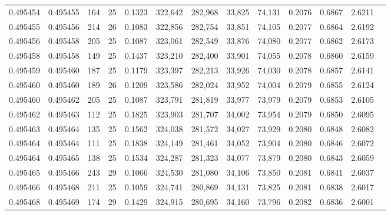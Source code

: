 \begin{tabular}{rrrrrrrrrrrrr}
0.495454 & 0.495455 & 164 &  25 &                                     0.1323 & 322,642 & 282,968 &  33,825 &  74,131 & 0.2076 & 0.6867 & 2.6211 \\
0.495455 & 0.495456 & 214 &  26 &                                     0.1083 & 322,856 & 282,754 &  33,851 &  74,105 & 0.2077 & 0.6864 & 2.6192 \\
0.495456 & 0.495458 & 205 &  25 &                                     0.1087 & 323,061 & 282,549 &  33,876 &  74,080 & 0.2077 & 0.6862 & 2.6173 \\
0.495458 & 0.495458 & 149 &  25 &                                     0.1437 & 323,210 & 282,400 &  33,901 &  74,055 & 0.2078 & 0.6860 & 2.6159 \\
0.495459 & 0.495460 & 187 &  25 &                                     0.1179 & 323,397 & 282,213 &  33,926 &  74,030 & 0.2078 & 0.6857 & 2.6141 \\
0.495460 & 0.495460 & 189 &  26 &                                     0.1209 & 323,586 & 282,024 &  33,952 &  74,004 & 0.2079 & 0.6855 & 2.6124 \\
0.495460 & 0.495462 & 205 &  25 &                                     0.1087 & 323,791 & 281,819 &  33,977 &  73,979 & 0.2079 & 0.6853 & 2.6105 \\
0.495462 & 0.495463 & 112 &  25 &                                     0.1825 & 323,903 & 281,707 &  34,002 &  73,954 & 0.2079 & 0.6850 & 2.6095 \\
0.495463 & 0.495464 & 135 &  25 &                                     0.1562 & 324,038 & 281,572 &  34,027 &  73,929 & 0.2080 & 0.6848 & 2.6082 \\
0.495464 & 0.495464 & 111 &  25 &                                     0.1838 & 324,149 & 281,461 &  34,052 &  73,904 & 0.2080 & 0.6846 & 2.6072 \\
0.495464 & 0.495465 & 138 &  25 &                                     0.1534 & 324,287 & 281,323 &  34,077 &  73,879 & 0.2080 & 0.6843 & 2.6059 \\
0.495465 & 0.495466 & 243 &  29 &                                     0.1066 & 324,530 & 281,080 &  34,106 &  73,850 & 0.2081 & 0.6841 & 2.6037 \\
0.495466 & 0.495468 & 211 &  25 &                                     0.1059 & 324,741 & 280,869 &  34,131 &  73,825 & 0.2081 & 0.6838 & 2.6017 \\
0.495468 & 0.495469 & 174 &  29 &                                     0.1429 & 324,915 & 280,695 &  34,160 &  73,796 & 0.2082 & 0.6836 & 2.6001 \\

\end{tabular}
